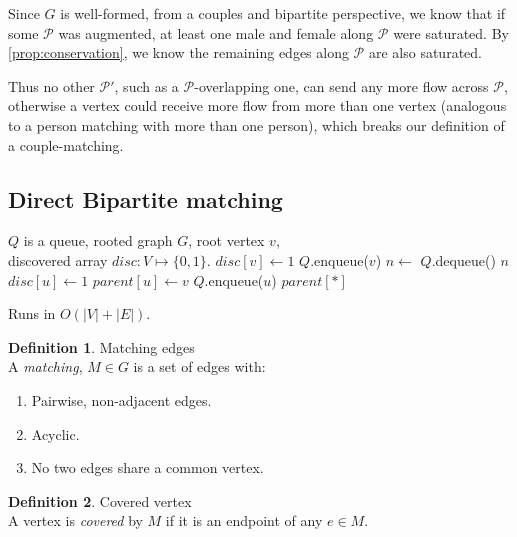 \documentclass{article}
\theoremstyle{definition}
\newtheorem{definition}{Definition}[section]
\begin{document}
Since $G$ is well-formed, from a couples and bipartite perspective, we know that if some $\mathcal{P}$ was augmented, at least one male and female along $\mathcal{P}$ were saturated. By \ref{prop:conservation}, we know the remaining edges along $\mathcal{P}$ are also saturated. 

Thus no other $\mathcal{P'}$, such as a $\mathcal{P}$-overlapping one, can send any more flow across $\mathcal{P}$, otherwise a vertex could receive more flow from more than one vertex (analogous to a person matching with more than one person), which breaks our definition of a couple-matching.

\subsection{Direct Bipartite matching}
\begin{algorithm}
	\caption{$BFS$}
	\label{alg:bfs}
	\begin{algorithmic}[1]
		\REQUIRE $Q$ is a queue, rooted graph $G$, root vertex $v$,\\discovered array $disc : V \mapsto \{0, 1\}$.
		\STATE $disc[v] \gets 1$
		\STATE $Q$.enqueue($v$)
			\STATE $n \gets$ $Q$.dequeue()
				\RETURN $n$
			\ENDIF
					\STATE $disc[u] \gets 1$
					\STATE $parent[u] \gets v$
					\STATE $Q$.enqueue($u$)
				\ENDIF
			\ENDFOR
		\ENDWHILE
		\RETURN $parent[*]$
	\end{algorithmic}
Runs in $O(|V|+|E|)$.
\end{algorithm}

\begin{definition}{Matching edges}
\label{def:match_edge}
	\\A \textit{matching}, $M \in G$ is a set of edges with:
	\begin{enumerate}
		\item Pairwise, non-adjacent edges.
		\item Acyclic.
		\item No two edges share a common vertex.
	\end{enumerate}
\end{definition}

\begin{definition}{Covered vertex}
	\label{def:covered_vtx}
	\\A vertex is \textit{covered} by $M$ if it is an endpoint of any $e \in M$.
\end{definition}
\end{document}
